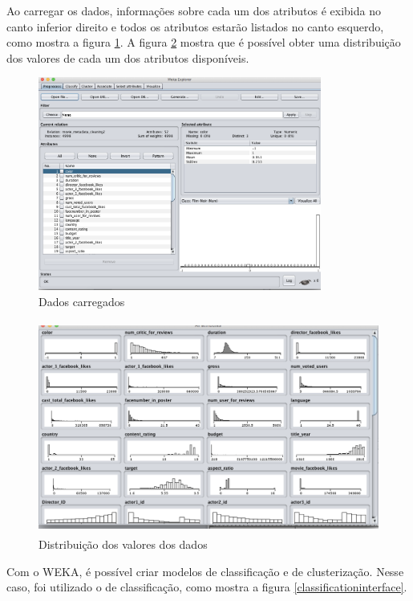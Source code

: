 Ao carregar os dados, informações sobre cada um dos atributos é exibida no canto inferior direito e todos os atributos estarão listados no canto esquerdo, como mostra a figura \ref{loadeddata}. A figura \ref{distribuicao} mostra que é possível obter uma distribuição dos valores de cada um dos atributos disponíveis.

\begin{figure}[H]
\centering
\includegraphics[height=7cm]{imagens/wekapreprocessingfull.png}
\caption{Dados carregados}
\label{loadeddata}
\end{figure}

\begin{figure}[H]
\centering
\includegraphics[height=7cm]{imagens/wekadistribuition.png}
\caption{Distribuição dos valores dos dados}
\label{distribuicao}
\end{figure}

Com o WEKA, é possível criar modelos de classificação e de clusterização. Nesse caso, foi utilizado o de classificação, como mostra a figura \ref{classificationinterface}. 

